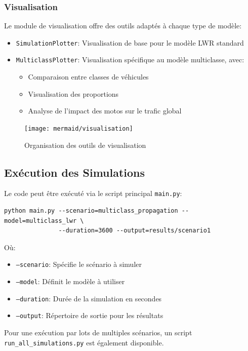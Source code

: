 \subsubsection{Visualisation}
Le module de visualisation offre des outils adaptés à chaque type de modèle:
\begin{itemize}
\item \texttt{SimulationPlotter}: Visualisation de base pour le modèle LWR standard
\item \texttt{MulticlassPlotter}: Visualisation spécifique au modèle multiclasse, avec:
  \begin{itemize}
  \item Comparaison entre classes de véhicules
  \item Visualisation des proportions
  \item Analyse de l'impact des motos sur le trafic global
  \end{itemize}
\end{itemize}

\begin{figure}[htbp]
\centering
\texttt{[image: mermaid/visualisation]}
\caption{Organisation des outils de visualisation}
\label{fig:visualization_tools}
\end{figure}

\subsection{Exécution des Simulations}
\label{subsec:execution}

Le code peut être exécuté via le script principal \texttt{main.py}:

\begin{verbatim}
python main.py --scenario=multiclass_propagation --model=multiclass_lwr \
               --duration=3600 --output=results/scenario1
\end{verbatim}

Où:
\begin{itemize}
\item \texttt{--scenario}: Spécifie le scénario à simuler
\item \texttt{--model}: Définit le modèle à utiliser
\item \texttt{--duration}: Durée de la simulation en secondes
\item \texttt{--output}: Répertoire de sortie pour les résultats
\end{itemize}

Pour une exécution par lots de multiples scénarios, un script \texttt{run\_all\_simulations.py} est également disponible.

